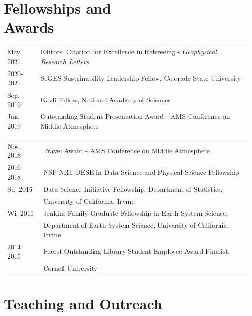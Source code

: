 \documentclass[margin,line,palatino,courier,10pt]{res}
\begin{document}
\begin{resume}
\section{\sc \textcolor{Cerulean}{\large{\textbf{Fellowships and\\ Awards}}}}
\begin{tabular}{@{}p{0.9in}p{4in}}
May 2021 & Editors' Citation for Excellence in Refereeing - \textit{Geophysical Research Letters}\\
2020-2021 & SoGES Sustainability Leadership Fellow, Colorado State University\\
Sep. 2019 & Kavli Fellow, National Academy of Sciences\\
Jan. 2019 & Outstanding Student Presentation Award - AMS Conference on Middle Atmosphere\\
\end{tabular}
\begin{tabular}{@{}p{0.9in}p{4in}}
Nov. 2018 & Travel Award - AMS Conference on Middle Atmosphere\\
2016-2018 & NSF NRT-DESE in Data Science and Physical Science Fellowship\\
Su. 2016 & Data Science Initiative Fellowship, Department of Statistics, \\
& University of California, Irvine\\
Wi. 2016 & Jenkins Family Graduate Fellowship in Earth System Science,\\ 
& Department of Earth System
Science, University of California, Irvine\\
2014-2015 & Fuerst Outstanding Library Student Employee Award Finalist,\\
& Cornell University
\end{tabular}


\vspace{-0.1in}
\noindent\textcolor{Cerulean}{\makebox[\linewidth][r]{\rule{\textwidth}{5pt}}}
\vspace{-0.3in}

\section{\sc \textcolor{Cerulean}{\large{\textbf{Teaching and Outreach}}}}


\end{resume}
\end{document}
